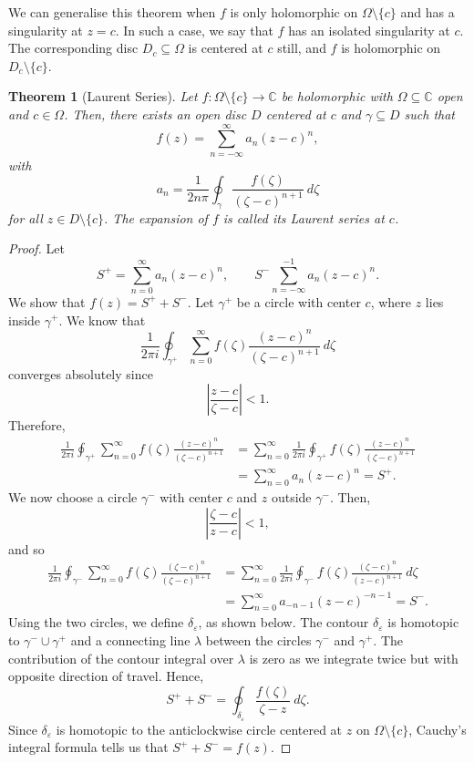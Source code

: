 \documentclass[a4paper, openany]{memoir}
\theoremstyle{definition}
\theoremstyle{plain}
\newtheorem{theorem}[definition]{Theorem}
\begin{document}
We can generalise this theorem when $f$ is only holomorphic on $\Omega \setminus \{c\}$ and has a singularity at $z = c$. In such a case, we say that $f$ has an isolated singularity at $c$. The corresponding disc $D_c \subseteq \Omega$ is centered at $c$ still, and $f$ is holomorphic on $D_c \setminus \{c\}$.
\begin{theorem}[Laurent Series]
Let $f: \Omega \setminus \{c\} \to \mathbb{C}$ be holomorphic with $\Omega \subseteq \mathbb{C}$ open and $c \in \Omega$. Then, there exists an open disc $D$ centered at $c$ and $\gamma \subseteq D$ such that
\[f(z) = \sum_{n=-\infty}^{\infty} a_n (z - c)^n,\]
with
\[a_n = \frac{1}{2n\pi} \oint_\gamma \frac{f(\zeta)}{(\zeta - c)^{n+1}} \ d\zeta\]
for all $z \in D \setminus \{c\}$. The expansion of $f$ is called its Laurent series at $c$.
\end{theorem}
\begin{proof}
Let
\[S^+ = \sum_{n=0}^\infty a_n (z - c)^n, \qquad S^- \sum_{n=-\infty}^{-1} a_n (z - c)^n.\]
We show that $f(z) = S^+ + S^-$. Let $\gamma^+$ be a circle with center $c$, where $z$ lies inside $\gamma^+$. We know that
\[\frac{1}{2\pi i} \oint_{\gamma^+} \sum_{n=0}^\infty f(\zeta) \frac{(z- c)^n}{(\zeta - c)^{n+1}} \ d\zeta\]
converges absolutely since
\[\left|\frac{z - c}{\zeta - c}\right| < 1.\]
Therefore,
\begin{align*}
    \frac{1}{2\pi i} \oint_{\gamma^+} \sum_{n=0}^\infty f(\zeta) \frac{(z - c)^n}{(\zeta - c)^{n+1}} &= \sum_{n=0}^\infty \frac{1}{2\pi i} \oint_{\gamma^+} f(\zeta) \frac{(z - c)^n}{(\zeta - c)^{n+1}} \\
    &= \sum_{n=0}^\infty a_n (z - c)^n = S^+.
\end{align*}
We now choose a circle $\gamma^-$ with center $c$ and $z$ outside $\gamma^-$. Then,
\[\left|\frac{\zeta - c}{z - c}\right| < 1,\]
and so
\begin{align*}
    \frac{1}{2\pi i} \oint_{\gamma^-} \sum_{n=0}^\infty f(\zeta) \frac{(\zeta - c)^n}{(\zeta - c)^{n+1}} &= \sum_{n=0}^\infty \frac{1}{2\pi i} \oint_{\gamma^-} f(\zeta) \frac{(\zeta - c)^n}{(z - c)^{n+1}} \ d\zeta \\
    &= \sum_{n=0}^\infty a_{-n-1}(z - c)^{-n-1} = S^-.
\end{align*}
Using the two circles, we define $\delta_\varepsilon$, as shown below.
The contour $\delta_\varepsilon$ is homotopic to $\gamma^- \cup \gamma^+$ and a connecting line $\lambda$ between the circles $\gamma^-$ and $\gamma^+$. The contribution of the contour integral over $\lambda$ is zero as we integrate twice but with opposite direction of travel. Hence,
\[S^+ + S^- = \oint_{\delta_\varepsilon} \frac{f(\zeta)}{\zeta - z} \ d\zeta.\]
Since $\delta_\varepsilon$ is homotopic to the anticlockwise circle centered at $z$ on $\Omega \setminus \{c\}$, Cauchy's integral formula tells us that $S^+ + S^- = f(z)$.
\end{proof}
\end{document}
